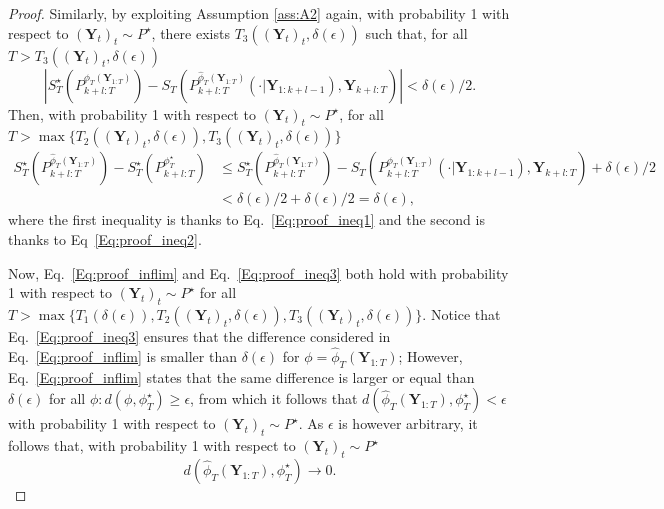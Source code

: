 \documentclass[twoside,11pt]{article}
\newcommand{\Ddobs}{\mathbf{Y}}
\newcommand{\DdobsupT}{\mathbf{Y}_{1:T}}
\newcommand{\Ddobsupkplusl}{\mathbf{Y}_{1:k+l-1}}
\newcommand{\DdobsupTfromk}{\mathbf{Y}_{k+l:T}}
\begin{document}
\begin{proof}
		Similarly, by exploiting Assumption \ref{ass:A2} again, with probability 1 with respect to $(\Ddobs_t)_t\sim P^\star $, there exists $  T_3((\Ddobs_t)_t, \delta(\epsilon)) $ such that, for all $ T>T_3((\Ddobs_t)_t, \delta(\epsilon))$
		\begin{equation}\label{Eq:proof_ineq2}
		\left| S^\star_T(P^{\hat \phi_T (\DdobsupT)}_{k+l:T}) - S_T(P^{\hat \phi_T (\DdobsupT)}_{k+l:T}(\cdot|\Ddobsupkplusl), \DdobsupTfromk) \right| <\delta(\epsilon)/2.
		\end{equation}
		Then, with probability 1 with respect to $(\Ddobs_t)_t\sim P^\star$, for all\\$ T>\max\{T_2((\Ddobs_t)_t, \delta(\epsilon)), T_3((\Ddobs_t)_t, \delta(\epsilon))\} $
		\begin{equation}\label{Eq:proof_ineq3}
		\begin{aligned}
		S_T^\star(P^{\hat \phi_T (\DdobsupT)}_{k+l:T}) - S_T^\star(P^{\phi^\star_T}_{k+l:T}) &\le S_T^\star(P^{\hat \phi_T (\DdobsupT)}_{k+l:T}) - S_T(P^{\hat \phi_T (\DdobsupT)}_{k+l:T}(\cdot|\Ddobsupkplusl), \DdobsupTfromk) + \delta(\epsilon)/2 \\
		&<  \delta(\epsilon)/2+ \delta(\epsilon)/2 = \delta(\epsilon),
		\end{aligned}
		\end{equation}
		where the first inequality is thanks to Eq.~\eqref{Eq:proof_ineq1} and the second is thanks to Eq~\eqref{Eq:proof_ineq2}. 
		
		Now, Eq.~\eqref{Eq:proof_inflim} and Eq.~\eqref{Eq:proof_ineq3} both hold with probability 1 with respect to $(\Ddobs_t)_t\sim P^\star $ for all $ T>\max\{T_1(\delta(\epsilon)), T_2((\Ddobs_t)_t, \delta(\epsilon)), T_3((\Ddobs_t)_t, \delta(\epsilon))\} $. Notice that Eq.~\eqref{Eq:proof_ineq3} ensures that the difference considered in Eq.~\eqref{Eq:proof_inflim} is smaller than $ \delta(\epsilon )$ for $ \phi =  \hat \phi_T(\DdobsupT)$; However, Eq.~\eqref{Eq:proof_inflim} states that the same difference is larger or equal than $ \delta(\epsilon) $ for all $ \phi:d(\phi, {\phi^\star_T})\ge\epsilon $, from which it follows that 
		$  d({\hat \phi_T(\DdobsupT)}, {\phi^\star_T})<\epsilon $ with probability 1 with respect to $(\Ddobs_t)_t\sim P^\star$. As $ \epsilon $ is however arbitrary, it follows that, with probability 1 with respect to $(\Ddobs_t)_t\sim P^\star$
		\begin{equation}\label{}
		d({\hat \phi_T(\DdobsupT)}, {\phi^\star_T}) \to 0.
		\end{equation}
	\end{proof}
	
\end{document}
